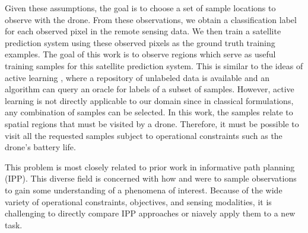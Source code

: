 Given these assumptions, the goal is to choose a set of sample locations to observe with the drone. From these observations, we obtain a classification label for each observed pixel in the remote sensing data. We then train a satellite prediction system using these observed pixels as the ground truth training examples. The goal of this work is to observe regions which serve as useful training samples for this satellite prediction system. This is similar to the ideas of active learning \cite{Active learning}, where a repository of unlabeled data is available and an algorithm can query an oracle for labels of a subset of samples. However, active learning is not directly applicable to our domain since in classical formulations, any combination of samples can be selected. In this work, the samples relate to spatial regions that must be visited by a drone. Therefore, it must be possible to visit all the requested samples subject to operational constraints such as the drone's battery life.

This problem is most closely related to prior work in informative path planning (IPP). This diverse field is concerned with how and were to sample observations to gain some understanding of a phenomena of interest. Because of the wide variety of operational constraints, objectives, and sensing modalities, it is challenging to directly compare IPP approaches or niavely apply them to a new task. 




\begin{table}[]
\caption{A comparison}
\label{tab:my-table}
\end{table}

